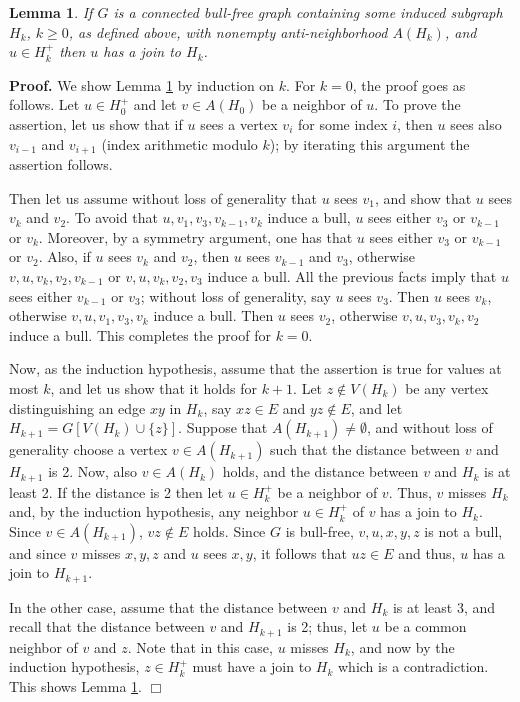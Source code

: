 \documentclass[11pt]{article}
\newcommand{\qed}{\hfill $\Box$}
\newcommand{\0}{\text{ has a co-join to }}
\newcommand{\1}{\text{ has a join to }}
\newtheorem{lemm}{Lemma}
\begin{document}
\begin{lemm}\label{lemm:bull}
If $G$ is a connected bull-free graph containing some induced subgraph $H_k$, $k \ge 0$, as defined above, with nonempty anti-neighborhood $A(H_k)$, and $u \in H_k^+$ then $u$ has a join to $H_k$. 
\end{lemm}

\noindent 
{\bf Proof.}
We show Lemma \ref{lemm:bull} by induction on $k$. For $k=0$, the proof goes as follows. Let $u \in H_0^+$ and let $v \in A(H_0)$ be a neighbor of $u$. To prove the assertion, let us show that if $u$ sees a vertex $v_i$ for some index $i$, then $u$ sees also $v_{i-1}$ and $v_{i+1}$ (index arithmetic modulo $k$); by iterating this argument the assertion follows.

Then let us assume without loss of generality that $u$ sees $v_1$, and show that $u$ sees $v_k$ and $v_2$. To avoid that $u,v_1,v_3,v_{k-1},v_k$ induce a bull, $u$ sees either $v_3$ or $v_{k-1}$ or $v_k$. Moreover, by a symmetry argument, one has that $u$ sees either $v_3$ or $v_{k-1}$ or $v_2$. Also, if $u$ sees $v_k$ and $v_2$, then $u$ sees $v_{k-1}$ and $v_3$, otherwise $v,u,v_k,v_2,v_{k-1}$ or $v,u,v_k,v_2,v_3$ induce a bull. All the previous facts imply that $u$ sees either $v_{k-1}$ or $v_3$; without loss of generality, say $u$ sees $v_3$. Then $u$ sees $v_k$, otherwise $v,u,v_1,v_3,v_k$ induce a bull. Then $u$ sees $v_2$, otherwise $v,u,v_3,v_k,v_2$ induce a bull. This completes the proof for $k=0$. 

\medskip

Now, as the induction hypothesis, assume that the assertion is true for values at most $k$, and let us show that it holds for $k+1$. Let $z \notin V(H_k)$ be any vertex distinguishing an edge $xy$ in $H_k$, say $xz \in E$ and $yz \notin E$, and let $H_{k+1}=G[V(H_k) \cup \{z\}]$. 
Suppose that $A(H_{k+1}) \neq \emptyset$, and without loss of generality choose a vertex $v \in A(H_{k+1})$ such that the distance between $v$ and $H_{k+1}$ is 2. Now, also $v \in A(H_{k})$ holds, and the distance between $v$ and $H_k$ is at least 2. If the distance is 2 then let $u \in H_k^+$ be a neighbor of $v$. Thus, $v$ misses $H_k$ and, by the induction hypothesis, any neighbor $u \in H_k^+$ of $v$ has a join to $H_k$. Since $v \in A(H_{k+1})$, $vz \notin E$ holds. Since $G$ is bull-free, $v,u,x,y,z$ is not a bull, and since $v$ misses $x,y,z$ and $u$ sees $x,y$, it follows that $uz \in E$ and thus, $u$ has a join to $H_{k+1}$. 

In the other case, assume that the distance between $v$ and $H_k$ is at least 3, and recall that the distance between $v$ and $H_{k+1}$ is 2; thus, let $u$ be a common neighbor of $v$ and $z$. Note that in this case, $u$ misses $H_k$, and now by the induction hypothesis, $z \in H_k^+$ must have a join to $H_k$ which is a contradiction.  
This shows Lemma \ref{lemm:bull}. 
\qed
\end{document}
